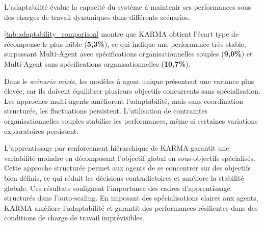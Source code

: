 L'adaptabilité évalue la capacité du système à maintenir ses performances sous des charges de travail dynamiques dans différents scénarios.
\begin{table}[h]
  \centering
  \caption{Comparaison de l'adaptabilité dans le scénario mixte.}
  \label{tab:adaptability_comparison}
\end{table}
%
\autoref{tab:adaptability_comparison} montre que KARMA obtient l'écart type de récompense le plus faible (\textbf{5,3\%}), ce qui indique une performance très stable, surpassant Multi-Agent avec spécifications organisationnelles souples (\textbf{9,0\%}) et Multi-Agent sans spécifications organisationnelles (\textbf{10,7\%}).

Dans le \textit{scénario mixte}, les modèles à agent unique présentent une variance plus élevée, car ils doivent équilibrer plusieurs objectifs concurrents sans spécialisation. Les approches multi-agents améliorent l'adaptabilité, mais sans coordination structurée, les fluctuations persistent. L'utilisation de contraintes organisationnelles souples stabilise les performances, même si certaines variations exploratoires persistent.

L'apprentissage par renforcement hiérarchique de KARMA garantit une variabilité moindre en décomposant l'objectif global en sous-objectifs spécialisés. Cette approche structurée permet aux agents de se concentrer sur des objectifs bien définis, ce qui réduit les décisions contradictoires et améliore la stabilité globale.
%
Ces résultats soulignent l'importance des cadres d'apprentissage structurés dans l'auto-scaling. En imposant des spécialisations claires aux agents, KARMA améliore l'adaptabilité et garantit des performances résilientes dans des conditions de charge de travail imprévisibles.


